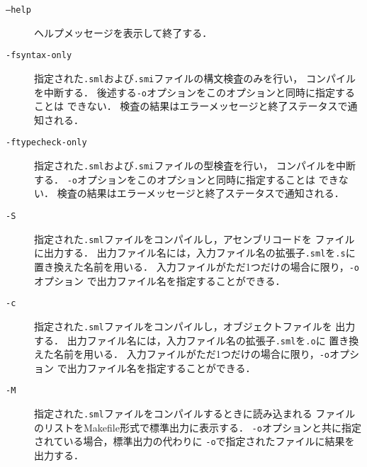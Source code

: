 \documentclass{jbook}
\newcommand{\smlsharp}{SML\#}
\begin{document}
\begin{description}
\item[{\tt --help}]
	ヘルプメッセージを表示して終了する．

\item[{\tt -fsyntax-only}]
	指定された{\tt .sml}および{\tt .smi}ファイルの構文検査のみを行い，
コンパイルを中断する．
	後述する{\tt -o}オプションをこのオプションと同時に指定することは
できない．
	検査の結果はエラーメッセージと終了ステータスで通知される．

\item[{\tt -ftypecheck-only}]
	指定された{\tt .sml}および{\tt .smi}ファイルの型検査を行い，
コンパイルを中断する．
	{\tt -o}オプションをこのオプションと同時に指定することは
できない．
	検査の結果はエラーメッセージと終了ステータスで通知される．

\item[{\tt -S}]
	指定された{\tt .sml}ファイルをコンパイルし，アセンブリコードを
ファイルに出力する．
	出力ファイル名には，入力ファイル名の拡張子{\tt .sml}を{\tt .s}に
置き換えた名前を用いる．
	入力ファイルがただ1つだけの場合に限り，{\tt -o}オプション
で出力ファイル名を指定することができる．

\item[{\tt -c}]
	指定された{\tt .sml}ファイルをコンパイルし，オブジェクトファイルを
出力する．
	出力ファイル名には，入力ファイル名の拡張子{\tt .sml}を{\tt .o}に
置き換えた名前を用いる．
	入力ファイルがただ1つだけの場合に限り，{\tt -o}オプション
で出力ファイル名を指定することができる．


\item[{\tt -M}]
	指定された{\tt .sml}ファイルをコンパイルするときに読み込まれる
ファイルのリストをMakefile形式で標準出力に表示する．
	{\tt -o}オプションと共に指定されている場合，標準出力の代わりに
{\tt -o}で指定されたファイルに結果を出力する．


\end{description}
\end{document}
